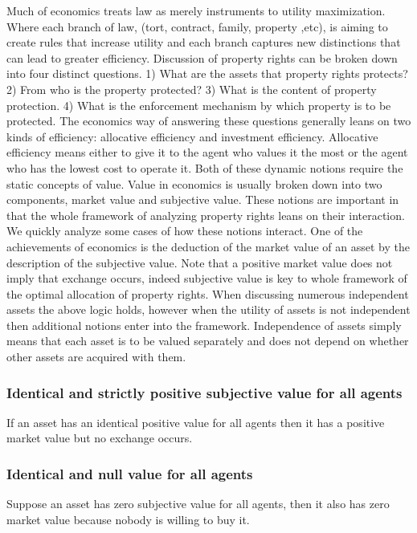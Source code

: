 \documentclass[12pt]{article}
\numberwithin{equation}{section}
\begin{document}
Much of economics treats law as merely instruments to utility maximization. Where each branch of law, (tort, contract, family, property ,etc), is aiming to create rules that increase utility and each branch captures new distinctions that can lead to greater efficiency. Discussion of property rights can be broken down into four distinct questions. 1) What are the assets that property rights protects? 2) From who is the property protected? 3) What is the content of property protection. 4) What is the enforcement mechanism by which property is to be protected. The economics way of answering these questions generally leans on two kinds of efficiency: allocative efficiency and investment efficiency. Allocative efficiency means either to give it to the agent who values it the most or the agent who has the lowest cost to operate it. Both of these dynamic notions require the static concepts of value. Value in economics is usually broken down into two components, market value and subjective value. These notions are important in that the whole framework of analyzing property rights leans on their interaction. We quickly analyze some cases of how these notions interact. One of the achievements of economics is the deduction of the market value of an asset by the description of the subjective value. Note that a positive market value does not imply that exchange occurs, indeed subjective value is key to whole framework of the optimal allocation of property rights. When discussing numerous independent assets the above logic holds, however when the utility of assets is not independent then additional notions enter into the framework. Independence of assets simply means that each asset is to be valued separately and does not depend on whether other assets are acquired with them.


\subsubsection{Identical and strictly positive subjective value for all agents}

If an asset has an identical positive value for all agents then it has a positive market value but no exchange occurs.

\subsubsection{Identical and null value for all agents}

Suppose an asset has zero subjective value for all agents, then it also has zero market value because nobody is willing to buy it.
\end{document}
